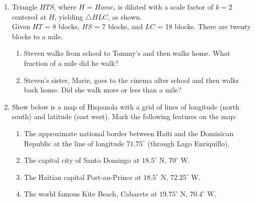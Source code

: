 \documentclass[12pt, twoside]{article}
\begin{document}
\begin{enumerate}
\item Triangle $HTS$, where $H$ = $Home$, is dilated with a scale factor of $k=2$ centered at $H$, yielding $\triangle HLC$, as shown.\\[0.25cm]
Given $HT$ = 8 blocks, $HS$ = 7 blocks, and $LC$ = 18 blocks. There are twenty blocks to a mile.
\begin{enumerate}
  \item Steven walks from school to Tommy's and then walks home. What fraction of a mile did he walk?
\begin{flushright}
\end{flushright} 
  \item Steven's sister, Marie, goes to the cinema after school and then walks back home. Did she walk more or less than a mile?
\end{enumerate}

\newpage
\item Show below is a map of Hispanola with a grid of lines of longitude (north south) and latitude (east west). Mark the following features on the map:
\begin{enumerate}
  \item The approximate national border between Haiti and the Dominican Republic at the line of longitude $71.75^\circ$ (through Lago Enriquillo).
  \item The capital city of Santo Domingo at $18.5^\circ$ N, $70^\circ$ W.
  \item The Haitian capital Port-au-Prince at $18.5^\circ$ N, $72.25^\circ$ W.
  \item The world famous Kite Beach, Cabarete at $19.75^\circ$ N, $70.4^\circ$ W.


\end{enumerate}
\end{enumerate}
\end{document}
